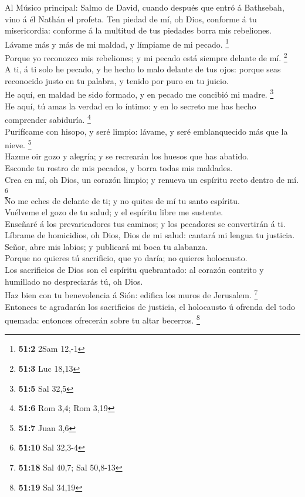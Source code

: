  Al Músico principal: Salmo de David, cuando después que
entró á Bathsebah, vino á él Nathán el profeta. Ten piedad de mí, oh
Dios, conforme á tu misericordia: conforme á la multitud de tus piedades
borra mis rebeliones.\\
 Lávame más y más de mi maldad, y límpiame de mi pecado.
\footnote{\textbf{51:2} 2Sam 12,-1}\\
 Porque yo reconozco mis rebeliones; y mi pecado está
siempre delante de mí. \footnote{\textbf{51:3} Luc 18,13}\\
 A ti, á ti solo he pecado, y he hecho lo malo delante de
tus ojos: porque seas reconocido justo en tu palabra, y tenido por puro
en tu juicio.\\
 He aquí, en maldad he sido formado, y en pecado me concibió
mi madre. \footnote{\textbf{51:5} Sal 32,5}\\
 He aquí, tú amas la verdad en lo íntimo: y en lo secreto me
has hecho comprender sabiduría. \footnote{\textbf{51:6} Rom 3,4; Rom
  3,19}\\
 Purifícame con hisopo, y seré limpio: lávame, y seré
emblanquecido más que la nieve. \footnote{\textbf{51:7} Juan 3,6}\\
 Hazme oir gozo y alegría; y se recrearán los huesos que has
abatido.\\
 Esconde tu rostro de mis pecados, y borra todas mis
maldades.\\
 Crea en mí, oh Dios, un corazón limpio; y renueva un
espíritu recto dentro de mí. \footnote{\textbf{51:10} Sal 32,3-4}\\
 No me eches de delante de ti; y no quites de mí tu santo
espíritu.\\
 Vuélveme el gozo de tu salud; y el espíritu libre me
sustente.\\
 Enseñaré á los prevaricadores tus caminos; y los pecadores
se convertirán á ti.\\
 Líbrame de homicidios, oh Dios, Dios de mi salud: cantará
mi lengua tu justicia.\\
 Señor, abre mis labios; y publicará mi boca tu alabanza.\\
 Porque no quieres tú sacrificio, que yo daría; no quieres
holocausto.\\
 Los sacrificios de Dios son el espíritu quebrantado: al
corazón contrito y humillado no despreciarás tú, oh Dios.\\
 Haz bien con tu benevolencia á Sión: edifica los muros de
Jerusalem. \footnote{\textbf{51:18} Sal 40,7; Sal 50,8-13}\\
 Entonces te agradarán los sacrificios de justicia, el
holocausto ú ofrenda del todo quemada: entonces ofrecerán sobre tu altar
becerros. \footnote{\textbf{51:19} Sal 34,19}

